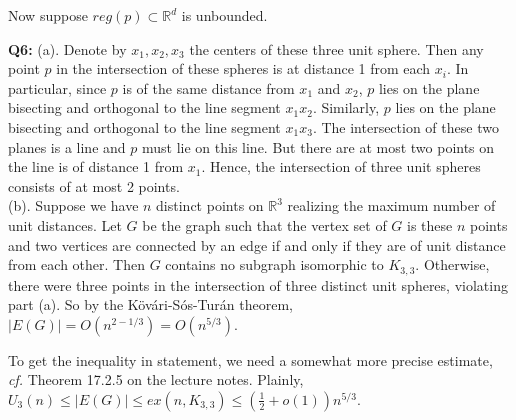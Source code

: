 \documentclass[12pt,reqno]{amsart}
\theoremstyle{definition}
\newcommand{\RR}{\mathbb{R}}
\begin{document}
Now suppose $reg(p)\subset \RR^d$ is unbounded.


\newpage
\noindent \textbf{Q6:} (a). Denote by $x_1,x_2,x_3$ the centers of these three unit sphere. Then any point $p$ in the intersection of these spheres is at distance 1 from each $x_i$. In particular, since $p$ is of the same distance from $x_1$ and $x_2$, $p$ lies on the plane bisecting and orthogonal to the line segment $x_1x_2$. Similarly, $p$ lies on the plane bisecting and orthogonal to the line segment $x_1x_3$. The intersection of these two planes is a line and $p$ must lie on this line. But there are at most two points on the line is of distance 1 from $x_1$. Hence, the intersection of three unit spheres consists of at most 2 points.\\


(b). Suppose we have $n$ distinct points on $\RR^3$ realizing the maximum number of unit distances. Let $G$ be the graph such that the vertex set of $G$ is these $n$ points and two vertices are connected by an edge if and only if they are of unit distance from each other. Then $G$ contains no subgraph isomorphic to $K_{3,3}$. Otherwise, there were three points in the intersection of three distinct unit spheres, violating part (a). So by the K{\"o}v{\'a}ri-S{\'o}s-Tur{\'a}n theorem, $|E(G)| = O(n^{2-1/3}) = O(n^{5/3})$.

To get the inequality in statement, we need a somewhat more precise estimate, \emph{cf.} Theorem 17.2.5 on the lecture notes. Plainly, $U_3(n) \leq |E(G)|\leq ex(n,K_{3,3}) \leq (\frac{1}{2}+o(1)) n^{5/3}$.
\end{document}
